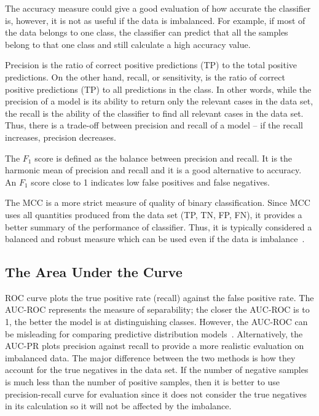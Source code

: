 The accuracy measure could give a good evaluation of how accurate the classifier is, however, it is not as useful if the data is imbalanced.
For example, if most of the data belongs to one class, the classifier can predict that all the samples belong to that one class and still calculate a high accuracy value.

Precision is the ratio of correct positive predictions (TP) to the total positive predictions.
On the other hand, recall, or sensitivity, is the ratio of correct positive predictions (TP) to all predictions in the class.
In other words, while the precision of a model is its ability to return only the relevant cases in the data set, the recall is the ability of the classifier to find all relevant cases in the data set.
Thus, there is a trade-off between precision and recall of a model -- if the recall increases, precision decreases.

The $F_{1}$ score is defined as the balance between precision and recall.
It is the harmonic mean of precision and recall and it is a good alternative to accuracy.
An $F_{1}$ score close to 1 indicates low false positives and false negatives.

The \ac{MCC} is a more strict measure of quality of binary classification.
Since \ac{MCC} uses all quantities produced from the data set (TP, TN, FP, FN), it provides a better summary of the performance of classifier.
Thus, it is typically considered a balanced and robust measure which can be used even if the data is imbalance~\cite{boughorbel_optimal_2017}.

\subsection{The Area Under the Curve}

\ac{ROC} curve plots the true positive rate (recall) against the false positive rate.
The \ac{AUC-ROC} represents the measure of separability; the closer the AUC-ROC is to 1, the better the model is at distinguishing classes.
However, the AUC-ROC can be misleading for comparing predictive distribution models~\cite{lobo_auc:_2008}.
Alternatively, the \ac{AUC-PR} plots precision against recall to provide a more realistic evaluation on imbalanced data.
The major difference between the two methods is how they account for the true negatives in the data set.
If the number of negative samples is much less than the number of positive samples, then it is better to use precision-recall curve for evaluation since it does not consider the true negatives in its calculation so it will not be affected by the imbalance.
